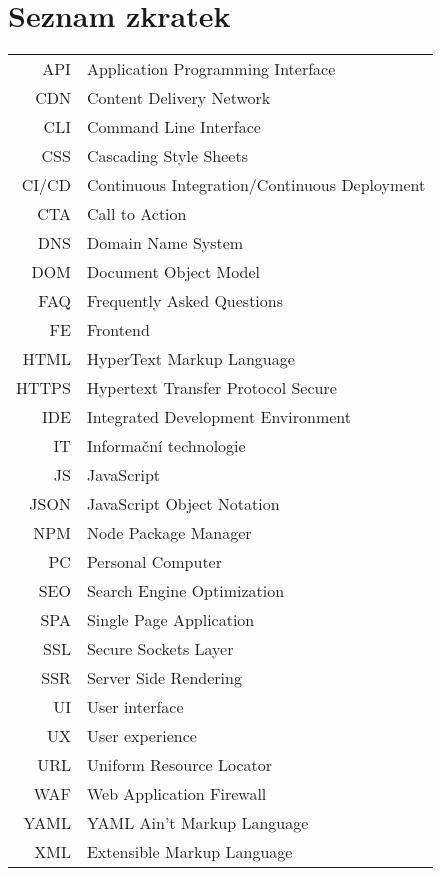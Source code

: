 
\chapter{Seznam zkratek}

\begin{tabular}{rl}
    API     & Application Programming Interface \\
    CDN     & Content Delivery Network \\
    CLI     & Command Line Interface \\
    CSS     & Cascading Style Sheets \\
    CI/CD   & Continuous Integration/Continuous Deployment \\
    CTA     & Call to Action \\
    DNS     & Domain Name System \\
    DOM     & Document Object Model \\
    FAQ     & Frequently Asked Questions \\
    FE      & Frontend \\
    HTML    & HyperText Markup Language \\
    HTTPS   & Hypertext Transfer Protocol Secure \\
    IDE     & Integrated Development Environment \\
    IT      & Informační technologie \\
    JS      & JavaScript \\
    JSON    & JavaScript Object Notation \\
    NPM     & Node Package Manager \\
    PC      & Personal Computer \\
    SEO     & Search Engine Optimization \\
    SPA     & Single Page Application \\
    SSL     & Secure Sockets Layer \\
    SSR     & Server Side Rendering \\
    UI      & User interface \\
    UX      & User experience \\
    URL     & Uniform Resource Locator \\
    WAF     & Web Application Firewall \\
    YAML    & YAML Ain't Markup Language \\
    XML     & Extensible Markup Language \\
\end{tabular}
